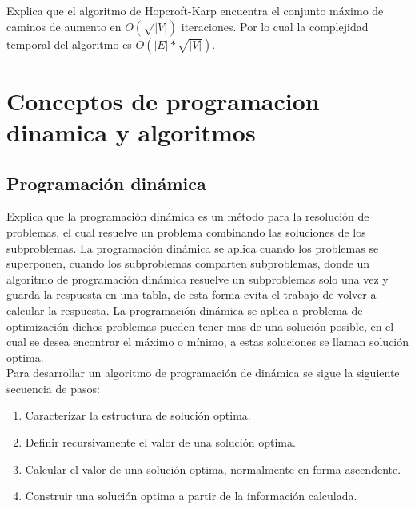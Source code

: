 

\cite{Cormen2009} Explica que el algoritmo de Hopcroft-Karp encuentra el conjunto máximo de caminos de aumento en $O(\sqrt{|V|})$ iteraciones. Por lo cual la complejidad temporal del algoritmo es $O(|E|*\sqrt{|V|})$.

\section{Conceptos de programacion dinamica y algoritmos}
\subsection{Programación dinámica}
\cite{Cormen2009} Explica que la programación dinámica es un método para la resolución de problemas, el cual resuelve un problema combinando las soluciones de los subproblemas. La programación dinámica se aplica cuando los problemas se superponen, cuando los subproblemas comparten subproblemas, donde un algoritmo de programación dinámica resuelve un subproblemas solo una vez y guarda la respuesta en una tabla, de esta forma evita el trabajo de volver a calcular la respuesta. La programación dinámica se aplica a problema de optimización dichos problemas pueden tener mas de una solución posible, en el cual se desea encontrar el máximo o mínimo, a estas soluciones se llaman solución optima.\\

\noindent Para desarrollar un algoritmo de programación de dinámica se sigue la siguiente secuencia de pasos:
\begin{enumerate}
    \item Caracterizar la estructura de solución optima.
    \item Definir recursivamente el valor de una solución optima.
    \item Calcular el valor de una solución optima, normalmente en forma ascendente.
    \item Construir una solución optima a partir de la información calculada.
\end{enumerate}


